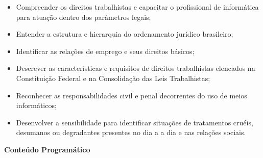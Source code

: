 \begin{itemize}

\item Compreender os direitos trabalhistas e capacitar o profissional de informática para atuação dentro dos parâmetros legais;

\item Entender a estrutura e hierarquia do ordenamento jurídico brasileiro;

\item Identificar as relações de emprego e seus direitos básicos;

\item Descrever as características e requisitos de direitos trabalhistas elencados na Constituição Federal e na Consolidação das Leis Trabalhistas;

\item Reconhecer as responsabilidades civil e penal decorrentes do uso de meios informáticos;

\item Desenvolver a sensibilidade para identificar situações de tratamentos cruéis, desumanos ou degradantes presentes no dia a a dia e nas relações sociais. 

\end{itemize}


\begin{snugshade}\begin{center}\textbf{
    Conteúdo Programático
}\end{center}\end{snugshade}

